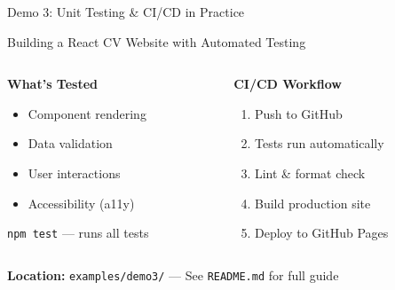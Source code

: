 \documentclass[aspectratio=169]{beamer}
\begin{document}
\begin{frame}[fragile]{Demo 3: Unit Testing \& CI/CD in Practice}
  \centering
  \large\bfseries

  Building a React CV Website with Automated Testing

  \vspace{0.5cm}

  \begin{columns}[T]
    \begin{column}{0.48\textwidth}
      \centering
      \normalsize\bfseries
      \textcolor{conesaTeal}{What's Tested}

      \vspace{0.3cm}
      \normalsize

      \begin{itemize}
        \item Component rendering
        \item Data validation
        \item User interactions
        \item Accessibility (a11y)
      \end{itemize}

      \vspace{0.2cm}
      \small
      \texttt{npm test} --- runs all tests
    \end{column}
    \begin{column}{0.48\textwidth}
      \centering
      \normalsize\bfseries
      \textcolor{conesaOrange}{CI/CD Workflow}

      \vspace{0.3cm}
      \normalsize

      \begin{enumerate}
        \item Push to GitHub
        \item Tests run automatically
        \item Lint \& format check
        \item Build production site
        \item Deploy to GitHub Pages
      \end{enumerate}
    \end{column}
  \end{columns}

  \vspace{0.5cm}
  \centering
  \normalsize
  \textbf{Location:} \texttt{examples/demo3/} --- See \texttt{README.md} for full guide
\end{frame}
\end{document}
